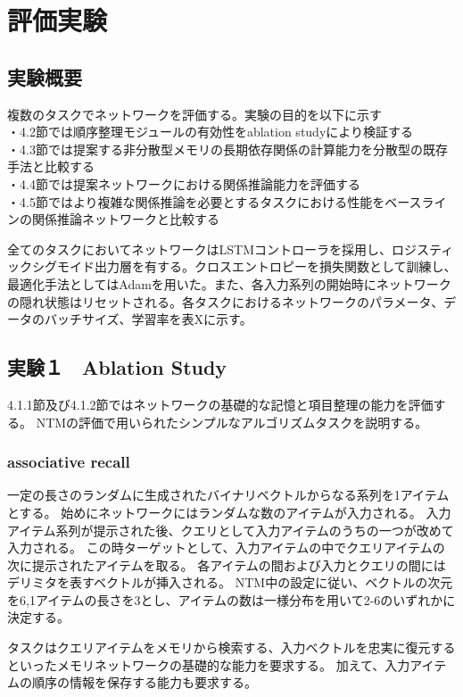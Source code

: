 \chapter{評価実験}

\label{chap:evaluation}

\section{実験概要}

複数のタスクでネットワークを評価する。実験の目的を以下に示す
\\・4.2節では順序整理モジュールの有効性をablation studyにより検証する
\\・4.3節では提案する非分散型メモリの長期依存関係の計算能力を分散型の既存手法と比較する
\\・4.4節では提案ネットワークにおける関係推論能力を評価する
\\・4.5節ではより複雑な関係推論を必要とするタスクにおける性能をベースラインの関係推論ネットワークと比較する

全てのタスクにおいてネットワークはLSTMコントローラを採用し、ロジスティックシグモイド出力層を有する。クロスエントロピーを損失関数として訓練し、最適化手法としてはAdamを用いた。また、各入力系列の開始時にネットワークの隠れ状態はリセットされる。各タスクにおけるネットワークのパラメータ、データのバッチサイズ、学習率を表Xに示す。


\section{実験１　Ablation Study}
4.1.1節及び4.1.2節ではネットワークの基礎的な記憶と項目整理の能力を評価する。
NTM\cite{ntm}の評価で用いられたシンプルなアルゴリズムタスクを説明する。

\subsection{associative recall}
一定の長さのランダムに生成されたバイナリベクトルからなる系列を1アイテムとする。
始めにネットワークにはランダムな数のアイテムが入力される。
入力アイテム系列が提示された後、クエリとして入力アイテムのうちの一つが改めて入力される。
この時ターゲットとして、入力アイテムの中でクエリアイテムの次に提示されたアイテムを取る。
各アイテムの間および入力とクエリの間にはデリミタを表すベクトルが挿入される。
NTM\cite{ntm}中の設定に従い、ベクトルの次元を6,1アイテムの長さを3とし、アイテムの数は一様分布を用いて2-6のいずれかに決定する。

タスクはクエリアイテムをメモリから検索する、入力ベクトルを忠実に復元するといったメモリネットワークの基礎的な能力を要求する。
加えて、入力アイテムの順序の情報を保存する能力も要求する。

